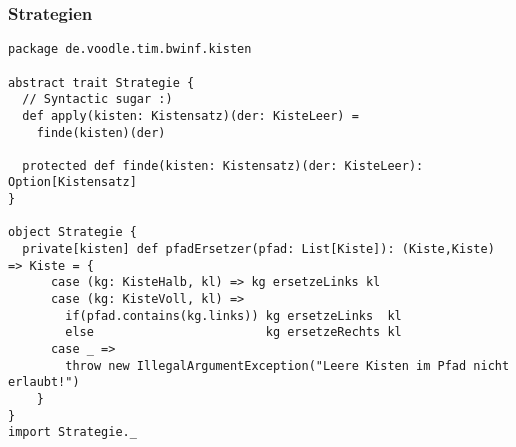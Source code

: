 \subsubsection*{Strategien}

\begin{lstlisting}
package de.voodle.tim.bwinf.kisten

abstract trait Strategie {
  // Syntactic sugar :)
  def apply(kisten: Kistensatz)(der: KisteLeer) =
    finde(kisten)(der)

  protected def finde(kisten: Kistensatz)(der: KisteLeer): Option[Kistensatz]
}

object Strategie {
  private[kisten] def pfadErsetzer(pfad: List[Kiste]): (Kiste,Kiste) => Kiste = {
      case (kg: KisteHalb, kl) => kg ersetzeLinks kl
      case (kg: KisteVoll, kl) =>
        if(pfad.contains(kg.links)) kg ersetzeLinks  kl
        else                        kg ersetzeRechts kl
      case _ =>
        throw new IllegalArgumentException("Leere Kisten im Pfad nicht erlaubt!")
    }
}
import Strategie._


\end{lstlisting}
